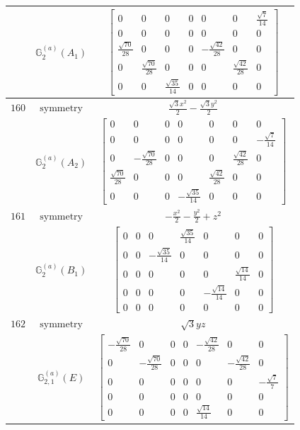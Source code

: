\documentclass[fleqn,8pt,landscape]{jsarticle}
\begin{document}
\begin{longtable}{ccc}
$  $ & $ \mathbb{G}_{2}^{(a)}(A_{1}) $ & $ \begin{bmatrix} 0 & 0 & 0 & 0 & 0 & 0 & \frac{\sqrt{7}}{14} \\ 0 & 0 & 0 & 0 & 0 & 0 & 0 \\ \frac{\sqrt{70}}{28} & 0 & 0 & 0 & - \frac{\sqrt{42}}{28} & 0 & 0 \\ 0 & \frac{\sqrt{70}}{28} & 0 & 0 & 0 & \frac{\sqrt{42}}{28} & 0 \\ 0 & 0 & \frac{\sqrt{35}}{14} & 0 & 0 & 0 & 0 \end{bmatrix} $ \\ \hline
$ 160 $ & $ \text{symmetry} $ & $ \frac{\sqrt{3} x^{2}}{2} - \frac{\sqrt{3} y^{2}}{2} $ \\
$  $ & $ \mathbb{G}_{2}^{(a)}(A_{2}) $ & $ \begin{bmatrix} 0 & 0 & 0 & 0 & 0 & 0 & 0 \\ 0 & 0 & 0 & 0 & 0 & 0 & - \frac{\sqrt{7}}{14} \\ 0 & - \frac{\sqrt{70}}{28} & 0 & 0 & 0 & \frac{\sqrt{42}}{28} & 0 \\ \frac{\sqrt{70}}{28} & 0 & 0 & 0 & \frac{\sqrt{42}}{28} & 0 & 0 \\ 0 & 0 & 0 & - \frac{\sqrt{35}}{14} & 0 & 0 & 0 \end{bmatrix} $ \\ \hline
$ 161 $ & $ \text{symmetry} $ & $ - \frac{x^{2}}{2} - \frac{y^{2}}{2} + z^{2} $ \\
$  $ & $ \mathbb{G}_{2}^{(a)}(B_{1}) $ & $ \begin{bmatrix} 0 & 0 & 0 & \frac{\sqrt{35}}{14} & 0 & 0 & 0 \\ 0 & 0 & - \frac{\sqrt{35}}{14} & 0 & 0 & 0 & 0 \\ 0 & 0 & 0 & 0 & 0 & \frac{\sqrt{14}}{14} & 0 \\ 0 & 0 & 0 & 0 & - \frac{\sqrt{14}}{14} & 0 & 0 \\ 0 & 0 & 0 & 0 & 0 & 0 & 0 \end{bmatrix} $ \\ \hline
$ 162 $ & $ \text{symmetry} $ & $ \sqrt{3} y z $ \\
$  $ & $ \mathbb{G}_{2,1}^{(a)}(E) $ & $ \begin{bmatrix} - \frac{\sqrt{70}}{28} & 0 & 0 & 0 & - \frac{\sqrt{42}}{28} & 0 & 0 \\ 0 & - \frac{\sqrt{70}}{28} & 0 & 0 & 0 & - \frac{\sqrt{42}}{28} & 0 \\ 0 & 0 & 0 & 0 & 0 & 0 & - \frac{\sqrt{7}}{7} \\ 0 & 0 & 0 & 0 & 0 & 0 & 0 \\ 0 & 0 & 0 & 0 & \frac{\sqrt{14}}{14} & 0 & 0 \end{bmatrix} $ \\ \hline

\end{longtable}
\end{document}
